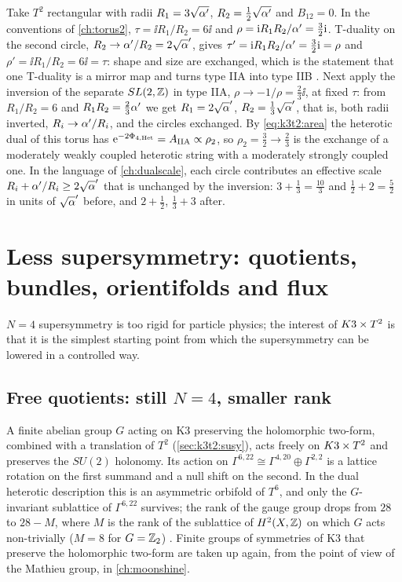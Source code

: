 \begin{example}\label{ex:k3t2:mirror}
Take $T^2$ rectangular with radii $R_1=3\sqrt{\alpha'}$, $R_2=\tfrac12\sqrt{\alpha'}$ and $B_{12}=0$.
In the conventions of \cref{ch:torus2}, $\tau=\ii R_1/R_2=6\ii$ and
$\rho=\mathrm{i} R_1R_2/\alpha'=\tfrac32\mathrm{i}$. T-duality on the second circle, $R_2\to\ap/R_2=2\sqrt\ap$,
gives $\tau'=\mathrm{i} R_1R_2/\alpha'=\tfrac32\mathrm{i}=\rho$ and $\rho'=\ii R_1/R_2=6\ii=\tau$: shape and
size are exchanged, which is the statement that one T-duality is a mirror map and turns type
IIA into type IIB . Next apply the inversion of
the separate $SL(2,\mathbb{Z})$ in type IIA, $\rho\to-1/\rho=\tfrac23\ii$, at fixed $\tau$: from
$R_1/R_2=6$ and $R_1R_2=\tfrac23\alpha'$ we get $R_1=2\sqrt\ap$, $R_2=\tfrac13\sqrt\ap$, that is,
both radii inverted, $R_i\to\alpha'/R_i$, and the circles exchanged. By
\eqref{eq:k3t2:area} the heterotic dual of this torus has
$\mathrm{e}^{-2\Phi_{4,\rm Het}}=A_{\rm IIA}\propto\rho_2$, so $\rho_2=\tfrac32\to\tfrac23$ is the
exchange of a moderately weakly coupled heterotic string with a moderately strongly coupled
one. In the language of \cref{ch:dualscale}, each circle contributes an effective scale
$R_i+\ap/R_i\ge2\sqrt\ap$ that is unchanged by the inversion:
$3+\tfrac13=\tfrac{10}3$ and $\tfrac12+2=\tfrac52$ in units of $\sqrt\ap$ before, and
$2+\tfrac12$, $\tfrac13+3$ after.
\end{example}

\section{Less supersymmetry: quotients, bundles, orientifolds and flux}\label{sec:k3t2:less}

$N=4$ supersymmetry is too rigid for particle physics; the interest of $K3\times T^2$ is that it is
the simplest starting point from which the supersymmetry can be lowered in a controlled way.

\subsection{Free quotients: still \texorpdfstring{$N=4$}{N=4}, smaller rank}
A finite abelian group $G$ acting on K3 preserving the holomorphic two-form, combined with a
translation of $T^2$ (\cref{sec:k3t2:susy}), acts freely on $K3\times T^2$ and preserves the $SU(2)$
holonomy. Its action on $\Gamma^{6,22}\cong\Gamma^{4,20}\oplus\Gamma^{2,2}$ is a lattice
rotation on the first summand and a null shift on the second. In the dual heterotic
description this is an asymmetric orbifold of $T^6$, and only the $G$-invariant sublattice of
$\Gamma^{6,22}$ survives; the rank of the gauge group drops from $28$ to $28-M$, where $M$ is
the rank of the sublattice of $H^2(X,\mathbb{Z})$ on which $G$ acts non-trivially ($M=8$ for
$G=\mathbb{Z}_2$) . Finite groups of symmetries of K3 that preserve the holomorphic two-form are taken up
again, from the point of view of the Mathieu group, in \cref{ch:moonshine}.

